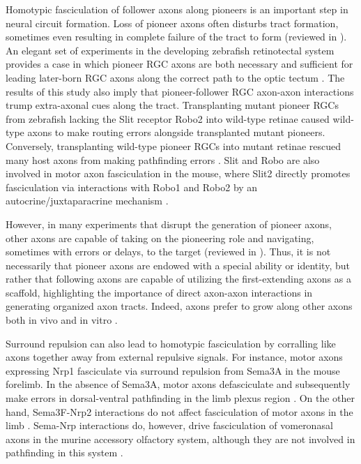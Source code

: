 Homotypic fasciculation of follower axons along pioneers is an important step in neural circuit formation.
Loss of pioneer axons often disturbs tract formation, sometimes even resulting in complete failure of the tract to form (reviewed in ).
An elegant set of experiments in the developing zebrafish retinotectal system provides a case in which pioneer RGC axons are both necessary and sufficient for leading later-born RGC axons along the correct path to the optic tectum \cite{pittman2008pathfinding}.
The results of this study also imply that pioneer-follower RGC axon-axon interactions trump extra-axonal cues along the tract.
Transplanting mutant pioneer RGCs from zebrafish lacking the Slit receptor Robo2 into wild-type retinae caused wild-type axons to make routing errors alongside transplanted mutant pioneers.
Conversely, transplanting wild-type pioneer RGCs into mutant retinae rescued many host axons from making pathfinding errors \cite{pittman2008pathfinding}.
Slit and Robo are also involved in motor axon fasciculation in the mouse, where Slit2 directly promotes fasciculation via interactions with Robo1 and Robo2 by an autocrine/juxtaparacrine mechanism \cite{jaworski2012autocrine}.

However, in many experiments that disrupt the generation of pioneer axons, other axons are capable of taking on the pioneering role and navigating, sometimes with errors or delays, to the target (reviewed in ).
Thus, it is not necessarily that pioneer axons are endowed with a special ability or identity, but rather that following axons are capable of utilizing the first-extending axons as a scaffold, highlighting the importance of direct axon-axon interactions in generating organized axon tracts.
Indeed, axons prefer to grow along other axons both in vivo \cite{raper1983pathfinding,tosney1985development} and in vitro \cite{bonhoeffer1985position}.

Surround repulsion can also lead to homotypic fasciculation by corralling like axons together away from external repulsive signals.
For instance, motor axons expressing Nrp1 fasciculate via surround repulsion from Sema3A in the mouse forelimb.
In the absence of Sema3A, motor axons defasciculate and subsequently make errors in dorsal-ventral pathfinding in the limb plexus region \cite{huber2005distinct}.
On the other hand, Sema3F-Nrp2 interactions do not affect fasciculation of motor axons in the limb \cite{huber2005distinct}.
Sema-Nrp interactions do, however, drive fasciculation of vomeronasal axons in the murine accessory olfactory system, although they are not involved in pathfinding in this system \cite{cloutier2002neuropilin}.

